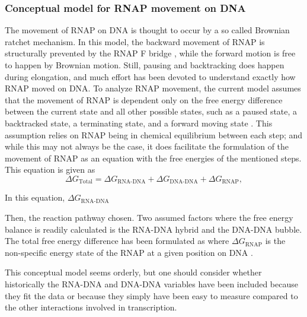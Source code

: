 %

\subsubsection{Conceptual model for RNAP movement on DNA}
The movement of RNAP on DNA is thought to occur by a so called Brownian ratchet
mechanism. In this model, the backward movement of RNAP is structurally
prevented by the RNAP F bridge \cite{bar-nahum_ratchet_2005}, while the forward
motion is free to happen by Brownian motion. Still, pausing and backtracking
does happen during elongation, and much effort has been devoted to understand
exactly how RNAP moved on DNA. To analyze RNAP movement, the current model
assumes that the movement of RNAP is dependent only on the free energy
difference between the current state and all other possible states, such as a
paused state, a backtracked state, a terminating state, and a forward moving
state \cite{greive_thinking_2005}. This assumption relies on RNAP being in
chemical equilibrium between each step; and while this may not always be the case,
it does facilitate the formulation of the movement of RNAP as an equation with
the free energies of the mentioned steps. This equation is given as
\cite{greive_thinking}
\begin{equation}
	\Delta G_{\text{Total}} = \Delta G_{\text{RNA-DNA}} + \Delta
	G_{\text{DNA-DNA}} + \Delta G_{\text{RNAP}},
	\label{eq:rnap_energy_balance}
\end{equation}

In this equation, $\Delta G_{\text{RNA-DNA}}$

Then, the reaction pathway chosen. Two assumed
factors where the free energy balance is readily calculated is the RNA-DNA
hybrid and the DNA-DNA bubble. The total free energy difference has been
formulated as
where $\Delta G_{\text{RNAP}}$ is the non-specific energy state of the RNAP at
a given position on DNA \cite{greive_thinking_2005}.

This conceptual model seems orderly, but one should consider whether
historically the RNA-DNA and DNA-DNA variables have been included because they
fit the data or because they simply have been easy to measure compared to the
other interactions involved in transcription.

